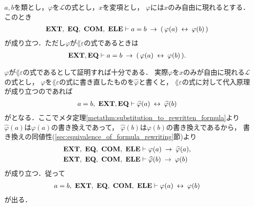 	
	
	\begin{screen}
		\begin{thm}[代入原理]\label{thm:the_principle_of_substitution}
			$a,b$を類とし，$\varphi$を$\mathcal{L}$の式とし，$x$を変項とし，
			$\varphi$には$x$のみ自由に現れるとする．このとき
			\begin{align}
				\mbox{{\bf EXT}},\ \mbox{{\bf EQ}},\ \mbox{\bf COM},\ \mbox{{\bf ELE}} \vdash a = b \hspace{0.25em}\rightarrow\hspace{0.25em} 
				(\, \varphi(a) \hspace{0.25em}\leftrightarrow\hspace{0.25em} \varphi(b)\, )
			\end{align}
			が成り立つ．ただし$\varphi$が$\lang{\varepsilon}$の式であるときは
			\begin{align}
				\mbox{{\bf EXT}},\mbox{{\bf EQ}} \vdash a = b \hspace{0.25em}\rightarrow\hspace{0.25em} 
				(\, \varphi(a) \hspace{0.25em}\leftrightarrow\hspace{0.25em} \varphi(b)\, ).
			\end{align}
		\end{thm}
	\end{screen}
	
	$\varphi$が$\lang{\varepsilon}$の式であるとして証明すれば十分である．
	実際$\varphi$を$x$のみが自由に現れる$\mathcal{L}$の式とし，
	$\varphi$を$\lang{\varepsilon}$の式に書き直したものを$\widehat{\varphi}$と書くと，
	$\lang{\varepsilon}$の式に対して代入原理が成り立つのであれば
	\begin{align}
		a = b,\ \mbox{{\bf EXT}},\mbox{{\bf EQ}} \vdash \widehat{\varphi}(a) \hspace{0.25em}\leftrightarrow\hspace{0.25em} \widehat{\varphi}(b)
	\end{align}
	がとなる．ここでメタ定理\ref{metathm:substitution_to_rewritten_formula}より
	$\widehat{\varphi}(a)$は$\varphi(a)$の書き換えであって，
	$\widehat{\varphi}(b)$は$\varphi(b)$の書き換えであるから，
	書き換えの同値性(\ref{sec:equivalence_of_formula_rewriting}節)より
	\begin{align}
		\mbox{{\bf EXT}},\ \mbox{{\bf EQ}},\ \mbox{\bf COM},\ \mbox{{\bf ELE}} &\vdash \varphi(a) \hspace{0.25em}\rightarrow\hspace{0.25em} \widehat{\varphi}(a), \\
		\mbox{{\bf EXT}},\ \mbox{{\bf EQ}},\ \mbox{\bf COM},\ \mbox{{\bf ELE}} &\vdash \widehat{\varphi}(b) \hspace{0.25em}\rightarrow\hspace{0.25em} \varphi(b)
	\end{align}
	が成り立つ．従って
	\begin{align}
		a = b,\ \mbox{{\bf EXT}},\ \mbox{{\bf EQ}},\ \mbox{\bf COM},\ \mbox{{\bf ELE}} \vdash \varphi(a) \hspace{0.25em}\leftrightarrow\hspace{0.25em} \varphi(b)
	\end{align}
	が出る．
	
